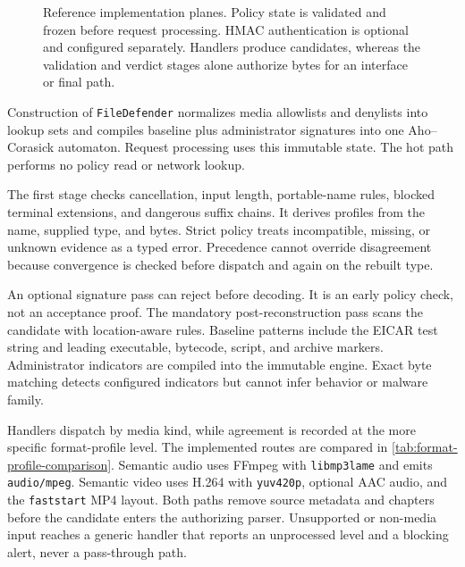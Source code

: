 \begin{figure}[t]
{%
}
\caption{Reference implementation planes. Policy state is validated and frozen
before request processing. HMAC authentication is optional and configured
separately. Handlers produce candidates, whereas the
validation and verdict stages alone authorize bytes for an interface or final
path.}
\label{fig:implementation-planes}
\end{figure}

Construction of \texttt{FileDefender} normalizes media allowlists and denylists
into lookup sets and compiles baseline plus administrator signatures into one
Aho--Corasick automaton. Request processing uses this immutable state. The hot
path performs no policy read or network lookup.

The first stage checks cancellation, input length, portable-name rules, blocked
terminal extensions, and dangerous suffix chains. It derives profiles from the
name, supplied type, and bytes. Strict policy treats incompatible, missing, or
unknown evidence as a typed error. Precedence cannot override disagreement
because convergence is checked before dispatch and again on the rebuilt type.

An optional signature pass can reject before decoding. It is an early policy
check, not an acceptance proof. The mandatory post-reconstruction pass scans
the candidate with location-aware rules. Baseline patterns include the EICAR
test string and leading executable, bytecode, script, and archive markers.
Administrator indicators are compiled into the immutable engine. Exact byte
matching detects configured indicators but cannot infer behavior or malware
family.

Handlers dispatch by media kind, while agreement is recorded at the more
specific format-profile level. The implemented routes are compared in
\cref{tab:format-profile-comparison}. Semantic audio uses FFmpeg with
\texttt{libmp3lame} and emits \texttt{audio/mpeg}. Semantic video uses H.264
with \texttt{yuv420p}, optional AAC audio, and the \texttt{faststart} MP4 layout.
Both paths remove source metadata and chapters before the candidate enters the
authorizing parser.
Unsupported or non-media input reaches a generic handler that reports an
unprocessed level and a blocking alert, never a pass-through path.

